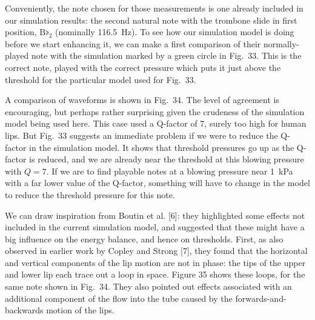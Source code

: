   Conveniently, the note chosen for those measurements is one already included 
  in our simulation results: the second natural note with the trombone slide in 
  first position, $\mathrm{B}\flat_2$ (nominally 116.5~Hz). To see how our 
  simulation model is doing before we start enhancing it, we can make a first 
  comparison of their normally-played note with the simulation marked by a 
  green circle in Fig.\ 33. This is the correct note, played with the correct 
  pressure which puts it just above the threshold for the particular model used 
  for Fig.\ 33. 

  A comparison of waveforms is shown in Fig.\ 34. The level of agreement is 
  encouraging, but perhaps rather surprising given the crudeness of the 
  simulation model being used here. This case used a Q-factor of 7, surely too 
  high for human lips. But Fig.\ 33 suggests an immediate problem if we were to 
  reduce the Q-factor in the simulation model. It shows that threshold 
  pressures go up as the Q-factor is reduced, and we are already near the 
  threshold at this blowing pressure with $Q=7$. If we are to find playable 
  notes at a blowing pressure near 1~kPa with a far lower value of the 
  Q-factor, something will have to change in the model to reduce the threshold 
  pressure for this note. 


  We can draw inspiration from Boutin et al. [6]: they highlighted some effects 
  not included in the current simulation model, and suggested that these might 
  have a big influence on the energy balance, and hence on thresholds. First, 
  as also observed in earlier work by Copley and Strong [7], they found that 
  the horizontal and vertical components of the lip motion are not in phase: 
  the tips of the upper and lower lip each trace out a loop in space. Figure 35 
  shows these loops, for the same note shown in Fig.\ 34. They also pointed out 
  effects associated with an additional component of the flow into the tube 
  caused by the forwards-and-backwards motion of the lips. 

